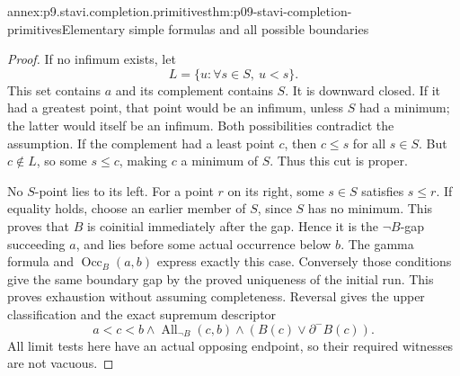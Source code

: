 \begin{annexitem}{annex:p9.stavi.completion.primitives}{thm:p09-stavi-completion-primitives}{Elementary simple formulas and all possible boundaries}
\begin{proof}
If no infimum exists, let
\[
                        L=\{u:\forall s\in S,\ u<s\}.
\]
This set contains \(a\) and
its complement contains \(S\).
It is downward closed.
If it had a greatest point,
that point would be an
infimum, unless \(S\)
had a minimum; the latter
would itself be an infimum.
Both possibilities contradict
the assumption. If the
complement had a least
point \(c\), then \(c\leq s\)
for all \(s\in S\).
But \(c\notin L\), so
some \(s\leq c\), making
\(c\) a minimum of \(S\).
Thus this cut is proper.

No \(S\)-point lies to its
left. For a point \(r\)
on its right, some
\(s\in S\) satisfies
\(s\leq r\). If equality
holds, choose an earlier
member of \(S\), since
\(S\) has no minimum.
This proves that \(B\)
is coinitial immediately
after the gap. Hence it
is the \(\neg B\)-gap
succeeding \(a\), and
lies before some actual
occurrence below \(b\).
The gamma formula and
\(\operatorname{Occ}_B(a,b)\)
express exactly this case.
Conversely those conditions
give the same boundary
gap by the proved
uniqueness of the initial
run. This proves exhaustion
without assuming completeness.
Reversal gives the upper
classification and the
exact supremum descriptor
\[
 a<c<b\land\operatorname{All}_{\neg B}(c,b)
                              \land(B(c)\lor\partial^-B(c)).
\]
All limit tests here have
an actual opposing endpoint,
so their required witnesses
are not vacuous.
\end{proof}
\end{annexitem}


